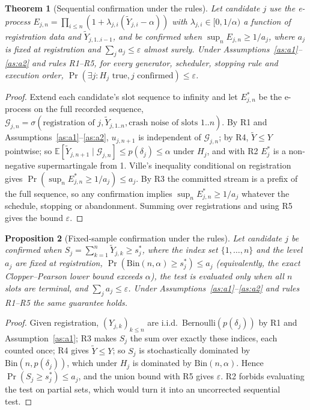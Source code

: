 \documentclass[11pt]{article}
\newtheorem{theorem}{Theorem}
\newtheorem{proposition}[theorem]{Proposition}
\theoremstyle{definition}
\newcommand{\E}{\mathbb{E}}
\begin{document}
\begin{theorem}[Sequential confirmation under the rules]\label{thm:seq}
Let candidate $j$ use the e-process $E_{j,n}=\prod_{i\le n}(1+\lambda_{j,i}(\tilde Y_{j,i}-\alpha))$ with $\lambda_{j,i}\in[0,1/\alpha)$ a function of registration data and $\tilde Y_{j,1..i-1}$, and be confirmed when $\sup_nE_{j,n}\ge1/a_j$, where $a_j$ is fixed at registration and $\sum_ja_j\le\varepsilon$ almost surely. Under Assumptions~\ref{as:a1}--\ref{as:a2} and rules R1--R5, for every generator, scheduler, stopping rule and execution order, $\Pr(\exists j:H_j\text{ true}, j\text{ confirmed})\le\varepsilon$.
\end{theorem}
\begin{proof}
Extend each candidate's slot sequence to infinity and let $E^*_{j,n}$ be the e-process on the full recorded sequence, $\mathcal G_{j,n}=\sigma(\text{registration of }j,\tilde Y_{j,1..n},\text{crash noise of slots }1..n)$. By R1 and Assumptions~\ref{as:a1}--\ref{as:a2}, $u_{j,n+1}$ is independent of $\mathcal G_{j,n}$; by R4, $\tilde Y\le Y$ pointwise; so $\E[\tilde Y_{j,n+1}\mid\mathcal G_{j,n}]\le p(\delta_j)\le\alpha$ under $H_j$, and with R2 $E^*_j$ is a non-negative supermartingale from 1. Ville's inequality conditional on registration gives $\Pr(\sup_nE^*_{j,n}\ge1/a_j)\le a_j$. By R3 the committed stream is a prefix of the full sequence, so any confirmation implies $\sup_nE^*_{j,n}\ge1/a_j$ whatever the schedule, stopping or abandonment. Summing over registrations and using R5 gives the bound $\varepsilon$.
\end{proof}

\begin{proposition}[Fixed-sample confirmation under the rules]\label{prop:fixed}
Let candidate $j$ be confirmed when $S_j=\sum_{k=1}^{n}\tilde Y_{j,k}\ge s^*_j$, where the index set $\{1,\dots,n\}$ and the level $a_j$ are fixed at registration, $\Pr(\mathrm{Bin}(n,\alpha)\ge s^*_j)\le a_j$ (equivalently, the exact Clopper--Pearson lower bound exceeds $\alpha$), the test is evaluated only when all $n$ slots are terminal, and $\sum_ja_j\le\varepsilon$. Under Assumptions~\ref{as:a1}--\ref{as:a2} and rules R1--R5 the same guarantee holds.
\end{proposition}
\begin{proof}
Given registration, $(Y_{j,k})_{k\le n}$ are i.i.d.\ Bernoulli$(p(\delta_j))$ by R1 and Assumption~\ref{as:a1}; R3 makes $S_j$ the sum over exactly these indices, each counted once; R4 gives $\tilde Y\le Y$; so $S_j$ is stochastically dominated by $\mathrm{Bin}(n,p(\delta_j))$, which under $H_j$ is dominated by $\mathrm{Bin}(n,\alpha)$. Hence $\Pr(S_j\ge s^*_j)\le a_j$, and the union bound with R5 gives $\varepsilon$. R2 forbids evaluating the test on partial sets, which would turn it into an uncorrected sequential test.
\end{proof}
\end{document}
